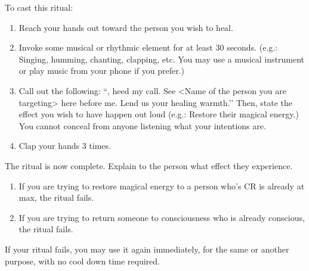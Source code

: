 \documentclass[green]{GL2020}
\begin{document}
To cast this ritual:
  \begin{enumerate}
    \item Reach your hands out toward the person you wish to heal.
    \item Invoke some musical or rhythmic element for at least 30 seconds. (e.g.: Singing, humming, chanting, clapping, etc. You may use a musical instrument or play music from your phone if you prefer.)
    \item Call out the following: ``\cFarmGod{}, heed my call. See <Name of the person you are targeting> here before me. Lend us your healing warmth.’’ Then, state the effect you wish to have happen out loud (e.g.: Restore their magical energy.) You cannot conceal from anyone listening what your intentions are.
    \item Clap your hands 3 times.
  \end{enumerate}
  
The ritual is now complete. Explain to the person what effect they experience. 
  \begin{enumerate}
    \item If you are trying to restore magical energy to a person who’s CR is already at max, the ritual fails.
    \item If you are trying to return someone to consciousness who is already conscious, the ritual fails.
  \end{enumerate}

If your ritual fails, you may use it again immediately, for the same or another purpose, with no cool down time required.
\end{document}
